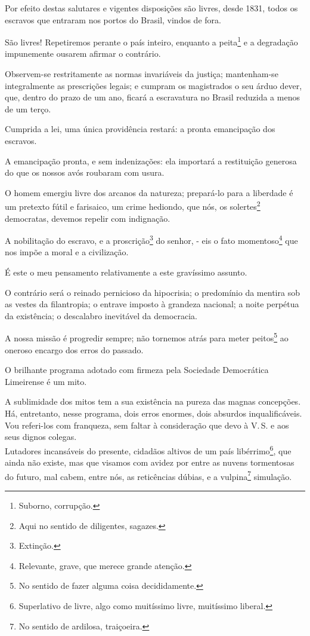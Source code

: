 Por efeito destas salutares e vigentes disposições são livres, desde
1831, todos os escravos que entraram nos portos do Brasil, vindos de
fora.

São livres! Repetiremos perante o país inteiro, enquanto a
peita\footnote{Suborno, corrupção.} e a degradação impunemente ousarem
afirmar o contrário.

Observem-se restritamente as normas invariáveis da justiça; mantenham-se
integralmente as prescrições legais; e cumpram os magistrados o seu
árduo dever, que, dentro do prazo de um ano, ficará a escravatura no
Brasil reduzida a menos de um terço.

Cumprida a lei, uma única providência restará: a pronta emancipação dos
escravos.

A emancipação pronta, e sem indenizações: ela importará a restituição
generosa do que os nossos avós roubaram com usura.

O homem emergiu livre dos arcanos da natureza; prepará-lo para a
liberdade é um pretexto fútil e farisaico, um crime hediondo, que nós,
os solertes\footnote{Aqui no sentido de diligentes, sagazes.}
democratas, devemos repelir com indignação.

A nobilitação do escravo, e a proscrição\footnote{Extinção.} do
senhor, - eis o fato momentoso\footnote{Relevante, grave, que merece
  grande atenção.} que nos impõe a moral e a civilização.

É este o meu pensamento relativamente a este gravíssimo assunto.

O contrário será o reinado pernicioso da hipocrisia; o predomínio da
mentira sob as vestes da filantropia; o entrave imposto à grandeza
nacional; a noite perpétua da existência; o descalabro inevitável da
democracia.

A nossa missão é progredir sempre; não tornemos atrás para meter
peitos\footnote{No sentido de fazer alguma coisa decididamente.} ao
oneroso encargo dos erros do passado.

O brilhante programa adotado com firmeza pela Sociedade Democrática
Limeirense é um mito.

A sublimidade dos mitos tem a sua existência na pureza das magnas
concepções.\\
Há, entretanto, nesse programa, dois erros enormes, dois absurdos
inqualificáveis.\\
Vou referi-los com franqueza, sem faltar à consideração que devo à V.\,S.
e aos seus dignos colegas.\\
Lutadores incansáveis do presente, cidadãos altivos de um país
libérrimo\footnote{Superlativo de livre, algo como muitíssimo livre,
  muitíssimo liberal.}, que ainda não existe, mas que visamos com avidez
por entre as nuvens tormentosas do futuro, mal cabem, entre nós, as
reticências dúbias, e a vulpina\footnote{No sentido de ardilosa,
  traiçoeira.} simulação.

